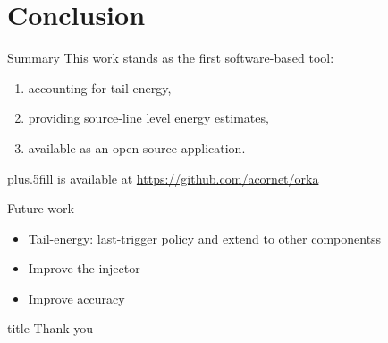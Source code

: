 \section{Conclusion}
\begin{frame}{Summary}
This work stands as the first software-based tool:
\begin{enumerate}
\item accounting for \alert{tail-energy},
\item providing \alert{source-line level} energy estimates,
\item available as an \alert{open-source} application.
\end{enumerate}
\vskip0pt plus.5fill
{\small \orka{} is available at \url{https://github.com/acornet/orka}}
\end{frame}
%
%
\begin{frame}{Future work}
\begin{itemize}
\item Tail-energy: last-trigger policy and extend to other componentss
\item Improve the injector
\item Improve accuracy
\end{itemize}
\end{frame}
%
%
\begin{frame}
  \vfill
  \centering
  \begin{beamercolorbox}[sep=8pt,center,shadow=true,rounded=true]{title}
    Thank you\par%
  \end{beamercolorbox}
  \vfill
\end{frame}
%
%
